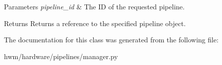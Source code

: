 \begin{DoxyParams}{Parameters}
{\em pipeline\-\_\-id} & The I\-D of the requested pipeline. \\
\hline
\end{DoxyParams}
\begin{DoxyReturn}{Returns}
Returns a reference to the specified pipeline object. 
\end{DoxyReturn}


The documentation for this class was generated from the following file\-:\begin{DoxyCompactItemize}
\item 
hwm/hardware/pipelines/manager.\-py\end{DoxyCompactItemize}
